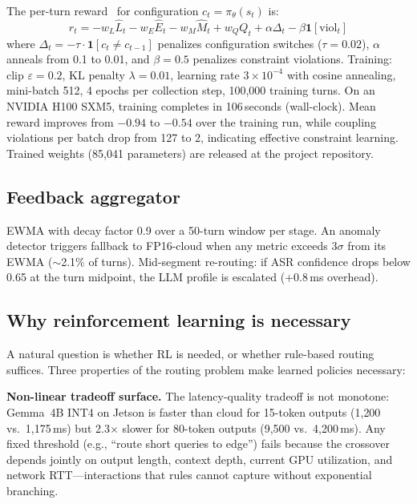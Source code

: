 \documentclass{article}
\begin{document}
The per-turn reward~\citep{schulman2017ppo} for configuration $c_t=\pi_\theta(s_t)$ is:
\begin{equation}
r_t = -w_L\hat{L}_t - w_E\hat{E}_t - w_M\hat{M}_t + w_QQ_t + \alpha\Delta_t - \beta\mathbf{1}[\text{viol}_t]
\label{eq:reward}
\end{equation}
where $\Delta_t=-\tau\cdot\mathbf{1}[c_t\neq c_{t-1}]$ penalizes configuration switches ($\tau=0.02$), $\alpha$ anneals from 0.1 to 0.01, and $\beta=0.5$ penalizes constraint violations. Training: clip $\varepsilon=0.2$, KL penalty $\lambda=0.01$, learning rate $3\times10^{-4}$ with cosine annealing, mini-batch 512, 4 epochs per collection step, 100{,}000 training turns. On an NVIDIA H100 SXM5, training completes in 106\,seconds (wall-clock). Mean reward improves from $-0.94$ to $-0.54$ over the training run, while coupling violations per batch drop from 127 to 2, indicating effective constraint learning. Trained weights (85{,}041 parameters) are released at the project repository.

\subsection{Feedback aggregator}

EWMA with decay factor 0.9 over a 50-turn window per stage. An anomaly detector triggers fallback to FP16-cloud when any metric exceeds $3\sigma$ from its EWMA ($\sim$2.1\% of turns). Mid-segment re-routing: if ASR confidence drops below 0.65 at the turn midpoint, the LLM profile is escalated (+0.8\,ms overhead).

\subsection{Why reinforcement learning is necessary}
\label{sec:why_rl}

A natural question is whether RL is needed, or whether rule-based routing suffices. Three properties of the routing problem make learned policies necessary:

\textbf{Non-linear tradeoff surface.} The latency-quality tradeoff is not monotone: Gemma~4B INT4 on Jetson is faster than cloud for 15-token outputs (1{,}200 vs.\ 1{,}175\,ms) but 2.3$\times$ slower for 80-token outputs (9{,}500 vs.\ 4{,}200\,ms). Any fixed threshold (e.g., ``route short queries to edge'') fails because the crossover depends jointly on output length, context depth, current GPU utilization, and network RTT---interactions that rules cannot capture without exponential branching.
\end{document}
